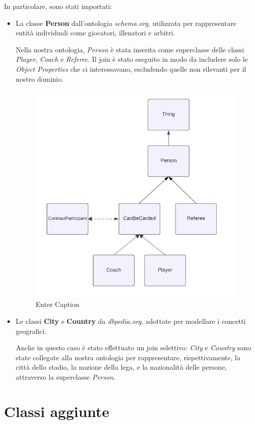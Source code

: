 \documentclass[11pt]{report} %
\begin{document}
In particolare, sono stati importati:

\begin{itemize}
  \item La classe \textbf{Person} dall'ontologia \textit{schema.org}, utilizzata per rappresentare entità individuali come giocatori, illenatori e arbitri. 
  
  Nella nostra ontologia, \textit{Person} è stata inserita come superclasse delle classi \textit{Player}, \textit{Coach} e \textit{Referee}. Il join è stato eseguito in modo da includere solo le \textit{Object Properties} che ci interessavano, escludendo quelle non rilevanti  per il nostro dominio.

  \begin{figure}[H]
      \centering
      \includegraphics[width=0.7\linewidth]{PERSON.png}
      \caption{Enter Caption}
      \label{fig:enter-label}
  \end{figure}

  \item Le classi \textbf{City} e \textbf{Country} da \textit{dbpedia.org}, adottate per modellare i concetti geografici. 
  
  Anche in questo caso è stato effettuato un join selettivo: \textit{City} e \textit{Country} sono state collegate alla nostra ontologia per rappresentare, rispettivamente, la città dello stadio, la nazione della lega, e la nazionalità delle persone, attraverso la superclasse \textit{Person}.
\end{itemize}

\newpage


 \section{Classi aggiunte}
\end{document}
